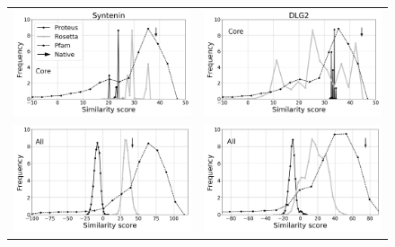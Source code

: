 \documentclass[a4paper,12pt]{article}
\begin{document}
   \begin{figure}[t]
     \centering
     \begin{tabular}{cc}
       \includegraphics[width=8.4cm]{rapport/resultats/PDZ/graphe/modelB/1R6J_simil_core.png} &
       \includegraphics[width=8.4cm]{rapport/resultats/PDZ/graphe/modelB/2BYG_simil_core.png} \\
       \includegraphics[width=8.4cm]{rapport/resultats/PDZ/graphe/modelB/1R6J_simil_cut.png} &
       \includegraphics[width=8.4cm]{rapport/resultats/PDZ/graphe/modelB/2BYG_simil_cut.png} \\

\end{tabular}
\end{figure}
\end{document}

